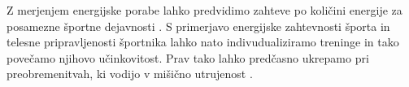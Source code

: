 Z merjenjem energijske porabe lahko predvidimo zahteve po količini energije za posamezne športne dejavnosti \cite{botton2011energy,osgnach2010energy}. S primerjavo energijske zahtevnosti športa in telesne pripravljenosti športnika lahko nato indivudualiziramo treninge in tako povečamo njihovo učinkovitost. Prav tako lahko predčasno ukrepamo pri preobremenitvah, ki vodijo v mišično utrujenost \cite{sahlin1998energy,reilly1997energetics}.



%



